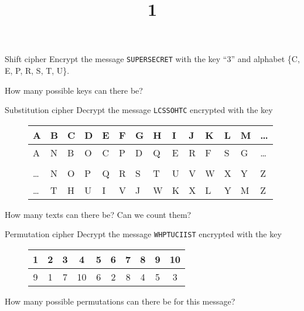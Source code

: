 \documentclass{practice}
\title{1}
\date{\DTMdate{2024-09-11}}
\begin{document}
\maketitle

\begin{task}{Shift cipher}
  Encrypt the message \texttt{SUPERSECRET} with the key \enquote{3} and alphabet \{C, E, P, R, S, T, U\}.

  How many possible keys can there be?
\end{task}

\begin{task}{Substitution cipher}
  Decrypt the message \texttt{LCSSOHTC} encrypted with the key
  \begin{figure}[h!]
    \centering
    \begin{tabular}{@{}C{.9em}C{.9em}C{.9em}C{.9em}C{.9em}C{.9em}C{.9em}C{.9em}C{.9em}C{.9em}C{.9em}C{.9em}C{.9em}C{.9em}@{}}
      A & B & C & D & E & F & G & H & I & J & K & L & M & \dots\\\midrule
      A & N & B & O & C & P & D & Q & E & R & F & S & G & \dots\\\\
      \dots & N & O & P & Q & R & S & T & U & V & W & X & Y & Z \\\midrule
      \dots & T & H & U & I & V & J & W & K & X & L & Y & M & Z \par
    \end{tabular}
  \end{figure}
  \vspace*{-1em}

  How many texts can there be? Can we count them?
\end{task}

\begin{task}{Permutation cipher}
  Decrypt the message \texttt{WHPTUCIIST} encrypted with the key
  \begin{figure}[h!]
    \centering
    \begin{tabular}{@{}c c c c c c c c c c@{}}
      1 & 2 & 3 & 4  & 5 & 6 & 7 & 8 & 9 & 10\\\midrule
      9 & 1 & 7 & 10 & 6 & 2 & 8 & 4 & 5 & 3
    \end{tabular}
  \end{figure}
  \vspace*{-1em}

  How many possible permutations can there be for this message?
\end{task}
\end{document}
